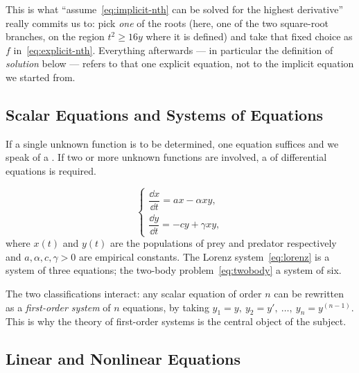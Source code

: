 \begin{remark}
	This is what ``assume~\eqref{eq:implicit-nth} can be solved for the highest
	derivative'' really commits us to: pick \emph{one} of the roots (here, one of the two
	square-root branches, on the region \(t^2 \geq 16y\) where it is defined) and take
	that fixed choice as \(f\) in~\eqref{eq:explicit-nth}. Everything afterwards --- in
	particular the definition of \emph{solution} below --- refers to that one explicit
	equation, not to the implicit equation we started from.
\end{remark}

\subsection{Scalar Equations and Systems of Equations}

\begin{definition}[System]
	If a single unknown function is to be determined, one equation suffices and we speak
	of a . If two or more unknown functions are involved, a
	 of differential equations is required.
\end{definition}

\begin{eg}
	\[
		\begin{cases}
			\dfrac{\dd x}{\dd t} = ax - \alpha xy, \\[1.2ex]
			\dfrac{\dd y}{\dd t} = -cy + \gamma xy,
		\end{cases}
	\]
	where \(x(t)\) and \(y(t)\) are the populations of prey and predator respectively and
	\(a, \alpha, c, \gamma > 0\) are empirical constants. The Lorenz
	system~\eqref{eq:lorenz} is a system of three equations; the two-body
	problem~\eqref{eq:twobody} a system of six.
\end{eg}

\begin{remark}
	The two classifications interact: any scalar equation of order \(n\) can be rewritten
	as a \emph{first-order system} of \(n\) equations, by taking
	\(y_1 = y,\ y_2 = y',\ \dots,\ y_n = y^{(n-1)}\). This is why the theory of
	first-order systems is the central object of the subject.
\end{remark}

\subsection{Linear and Nonlinear Equations}

